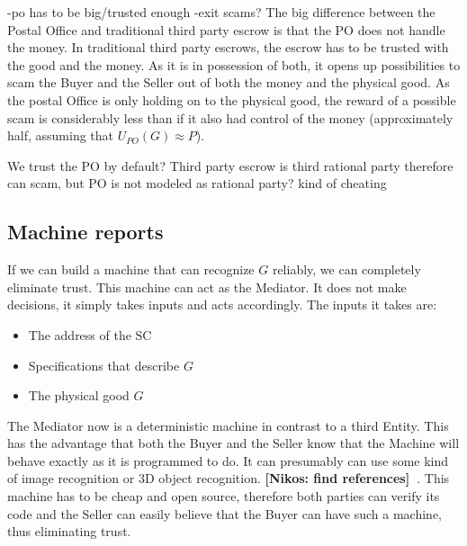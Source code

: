 \documentclass{cacthesis}
\newcommand{\authnote}[3]{{ \footnotesize \textbf{#1[#2: #3]~}}}
\newcommand{\niknote}[1]{\authnote{\color{red}}{Nikos}{#1}}
\begin{document}
-po has to be big/trusted enough\newline
-exit scams?
The big difference between the Postal Office and traditional third party escrow is that the PO does not handle the money. 
In traditional third party escrows, the escrow has to be trusted with the good and the money. As it is in possession of both, it opens up possibilities to scam the Buyer and the Seller out of both the money and the physical good.
As the postal Office is only holding on to the physical good, the reward of a
possible scam is considerably less than if it also had control of the money (approximately half, assuming that $U_{PO}(G) \approx P$). \newline 

We trust the PO by default? Third party escrow is third rational party therefore can scam, but PO is not modeled as rational party? kind of cheating
\subsection{Machine reports}
If we can build a machine that can recognize $G$ reliably, we can completely eliminate trust. This machine can act as the Mediator. It does not make decisions, it simply takes inputs and acts accordingly.\newline
The inputs it takes are:
\begin{itemize}
    \item The address of the SC
    \item Specifications that describe $G$
    \item The physical good $G$
\end{itemize}

The Mediator now is a deterministic machine in contrast to a third Entity. This has the advantage that both the Buyer and the Seller know that the Machine will behave exactly as it is programmed to do. It can presumably can use some kind of image recognition or 3D object recognition. \niknote{find references}. This machine has to be cheap
and open source, therefore both parties can verify its code and the Seller can
easily believe that the Buyer can have such a machine, thus eliminating trust.
\end{document}
